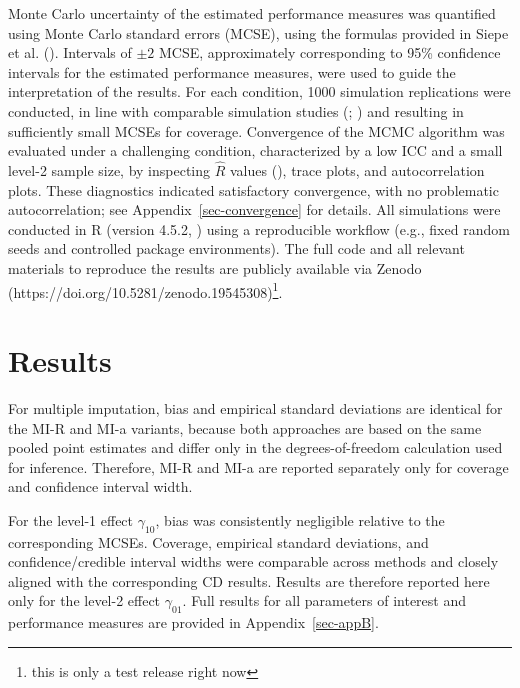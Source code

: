 \documentclass[
  letterpaper,
  11pt,
  english,
  singlespacing,
  headsepline,
  openany]{MastersDoctoralThesis}
\begin{document}
Monte Carlo uncertainty of the estimated performance measures was
quantified using Monte Carlo standard errors (MCSE), using the formulas
provided in Siepe et al. (). Intervals of
\(\pm 2\) MCSE, approximately corresponding to 95\% confidence intervals
for the estimated performance measures, were used to guide the
interpretation of the results. For each condition, 1000 simulation
replications were conducted, in line with comparable simulation studies
(;
) and resulting in
sufficiently small MCSEs for coverage. Convergence of the MCMC algorithm
was evaluated under a challenging condition, characterized by a low ICC
and a small level-2 sample size, by inspecting \(\hat{R}\) values
(), trace plots, and
autocorrelation plots. These diagnostics indicated satisfactory
convergence, with no problematic autocorrelation; see
Appendix~\ref{sec-convergence} for details. All simulations were
conducted in R (version 4.5.2, )
using a reproducible workflow (e.g., fixed random seeds and controlled
package environments). The full code and all relevant materials to
reproduce the results are publicly available via Zenodo
(https://doi.org/10.5281/zenodo.19545308)\footnote{this is only a test
  release right now}.


\chapter{Results}\label{results}

For multiple imputation, bias and empirical standard deviations are
identical for the MI-R and MI-a variants, because both approaches are
based on the same pooled point estimates and differ only in the
degrees-of-freedom calculation used for inference. Therefore, MI-R and
MI-a are reported separately only for coverage and confidence interval
width.

For the level-1 effect \(\gamma_{10}\), bias was consistently negligible
relative to the corresponding MCSEs. Coverage, empirical standard
deviations, and confidence/credible interval widths were comparable
across methods and closely aligned with the corresponding CD results.
Results are therefore reported here only for the level-2 effect
\(\gamma_{01}\). Full results for all parameters of interest and
performance measures are provided in Appendix~\ref{sec-appB}.
\end{document}
